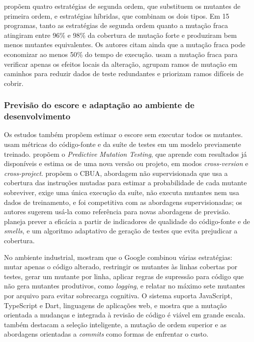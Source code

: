  propõem quatro estratégias de segunda ordem, que substituem os mutantes de primeira ordem, e estratégias híbridas, que combinam os dois tipos. Em 15 programas, tanto as estratégias de segunda ordem quanto a mutação fraca atingiram entre 96\% e 98\% da cobertura de mutação forte e produziram bem menos mutantes equivalentes. Os autores citam ainda que a mutação fraca pode economizar ao menos 50\% do tempo de execução.  usam a mutação fraca para verificar apenas os efeitos locais da alteração, agrupam ramos de mutação em caminhos para reduzir dados de teste redundantes e priorizam ramos difíceis de cobrir.

\subsubsection{Previsão do escore e adaptação ao ambiente de desenvolvimento}
\label{subsubsec:previsao-escore}

Os estudos também propõem estimar o escore sem executar todos os mutantes.  usam métricas do código-fonte e da suíte de testes em um modelo previamente treinado.  propõem o \textit{Predictive Mutation Testing}, que aprende com resultados já disponíveis e estima os de uma nova versão ou projeto, em modos \textit{cross-version} e \textit{cross-project}.  propõem o CBUA, abordagem não supervisionada que usa a cobertura das instruções mutadas para estimar a probabilidade de cada mutante sobreviver, exige uma única execução da suíte, não executa mutantes nem usa dados de treinamento, e foi competitiva com as abordagens supervisionadas; os autores sugerem usá-la como referência para novas abordagens de previsão.  planeja prever a eficácia a partir de indicadores de qualidade do código-fonte e de \textit{smells}, e um algoritmo adaptativo de geração de testes que evita prejudicar a cobertura.

No ambiente industrial,  mostram que o Google combinou várias estratégias: mutar apenas o código alterado, restringir os mutantes às linhas cobertas por testes, gerar um mutante por linha, aplicar regras de supressão para código que não gera mutantes produtivos, como \textit{logging}, e relatar no máximo sete mutantes por arquivo para evitar sobrecarga cognitiva. O sistema suporta JavaScript, TypeScript e Dart, linguagens de aplicações web, e mostra que a mutação orientada a mudanças e integrada à revisão de código é viável em grande escala.  também destacam a seleção inteligente, a mutação de ordem superior e as abordagens orientadas a \textit{commits} como formas de enfrentar o custo.

